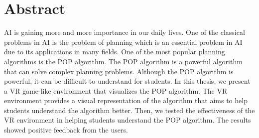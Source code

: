 \chapter*{Abstract}
\label{chap:abstract}

\ac{AI} is gaining more and more importance in our daily lives. One of the classical problems in \ac{AI} is the problem of planning which is an essential problem in \ac{AI} due to its applications in many fields. One of the most popular planning algorithms is the \ac{POP} algorithm. The \ac{POP} algorithm is a powerful algorithm that can solve complex planning problems. Although the \ac{POP} algorithm is powerful, it can be difficult to understand for students. In this thesis, we present a \ac{VR} game-like environment that visualizes the \ac{POP} algorithm. The \ac{VR} environment provides a visual representation of the algorithm that aims to help students understand the algorithm better. Then, we tested the effectiveness of the \ac{VR} environment in helping students understand the \ac{POP} algorithm. The results showed positive feedback from the users.